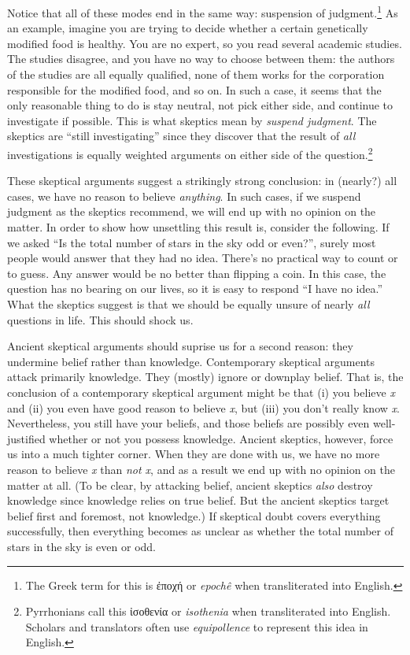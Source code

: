 Notice that all of these modes end in the same way: suspension of judgment.\footnote{The Greek term for this is \textgreek{ἐποχή} or \textit{epochê} when transliterated into English.} As an example, imagine you are trying to decide whether a certain genetically modified food is healthy. You are no expert, so you read several academic studies. The studies disagree, and you have no way to choose between them: the authors of the studies are all equally qualified, none of them works for the corporation responsible for the modified food, and so on. In such a case, it seems that the only reasonable thing to do is stay neutral, not pick either side, and continue to investigate if possible. This is what skeptics mean by \textit{suspend judgment}. The skeptics are ``still investigating'' since they discover that the result of \textit{all} investigations is equally weighted arguments on either side of the question.\footnote{Pyrrhonians call this \textgreek{ἰσοθενία} or \textit{isothenia} when transliterated into English. Scholars and translators often use \textit{equipollence} to represent this idea in English.}

These skeptical arguments suggest a strikingly strong conclusion: in (nearly?) all cases, we have no reason to believe \textit{anything}. In such cases, if we suspend judgment as the skeptics recommend, we will end up with no opinion on the matter. In order to show how unsettling this result is, consider the following. If we asked ``Is the total number of stars in the sky odd or even?'', surely most people would answer that they had no idea. There's no practical way to count or to guess. Any answer would be no better than flipping a coin. In this case, the question has no bearing on our lives, so it is easy to respond ``I have no idea.'' What the skeptics suggest is that we should be equally unsure of nearly \textit{all} questions in life. This should shock us.

Ancient skeptical arguments should suprise us for a second reason: they undermine belief rather than knowledge. Contemporary skeptical arguments attack  primarily knowledge. They (mostly) ignore or downplay belief. That is, the conclusion of a contemporary skeptical argument might be that (i) you believe \textit{x} and (ii) you even have good reason to believe \textit{x}, but (iii) you don't really know \textit{x}. Nevertheless, you still have your beliefs, and those beliefs are possibly even well-justified whether or not you possess knowledge. Ancient skeptics, however, force us into a much tighter corner. When they are done with us, we have no more reason to believe \textit{x} than \textit{not x}, and as a result we end up with no opinion on the matter at all. (To be clear, by attacking belief, ancient skeptics \textit{also} destroy knowledge since knowledge relies on true belief. But the ancient skeptics target belief first and foremost, not knowledge.) If skeptical doubt covers everything successfully, then everything becomes as unclear as whether the total number of stars in the sky is even or odd.


